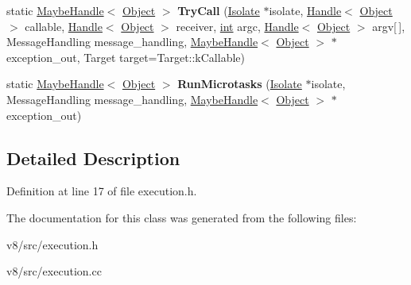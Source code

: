 \begin{DoxyCompactItemize}
\item 
\mbox{\label{classv8_1_1internal_1_1Execution_a2793497a034a5d1fcb69b8b287c27c99}} 
static \mbox{\hyperlink{classv8_1_1internal_1_1MaybeHandle}{Maybe\+Handle}}$<$ \mbox{\hyperlink{classv8_1_1internal_1_1Object}{Object}} $>$ {\bfseries Try\+Call} (\mbox{\hyperlink{classv8_1_1internal_1_1Isolate}{Isolate}} $\ast$isolate, \mbox{\hyperlink{classv8_1_1internal_1_1Handle}{Handle}}$<$ \mbox{\hyperlink{classv8_1_1internal_1_1Object}{Object}} $>$ callable, \mbox{\hyperlink{classv8_1_1internal_1_1Handle}{Handle}}$<$ \mbox{\hyperlink{classv8_1_1internal_1_1Object}{Object}} $>$ receiver, \mbox{\hyperlink{classint}{int}} argc, \mbox{\hyperlink{classv8_1_1internal_1_1Handle}{Handle}}$<$ \mbox{\hyperlink{classv8_1_1internal_1_1Object}{Object}} $>$ argv\mbox{[}$\,$\mbox{]}, Message\+Handling message\+\_\+handling, \mbox{\hyperlink{classv8_1_1internal_1_1MaybeHandle}{Maybe\+Handle}}$<$ \mbox{\hyperlink{classv8_1_1internal_1_1Object}{Object}} $>$ $\ast$exception\+\_\+out, Target target=Target\+::k\+Callable)
\item 
\mbox{\label{classv8_1_1internal_1_1Execution_a6ca7423baa125f74005e2c856180bfce}} 
static \mbox{\hyperlink{classv8_1_1internal_1_1MaybeHandle}{Maybe\+Handle}}$<$ \mbox{\hyperlink{classv8_1_1internal_1_1Object}{Object}} $>$ {\bfseries Run\+Microtasks} (\mbox{\hyperlink{classv8_1_1internal_1_1Isolate}{Isolate}} $\ast$isolate, Message\+Handling message\+\_\+handling, \mbox{\hyperlink{classv8_1_1internal_1_1MaybeHandle}{Maybe\+Handle}}$<$ \mbox{\hyperlink{classv8_1_1internal_1_1Object}{Object}} $>$ $\ast$exception\+\_\+out)
\end{DoxyCompactItemize}


\subsection{Detailed Description}


Definition at line 17 of file execution.\+h.



The documentation for this class was generated from the following files\+:\begin{DoxyCompactItemize}
\item 
v8/src/execution.\+h\item 
v8/src/execution.\+cc\end{DoxyCompactItemize}
